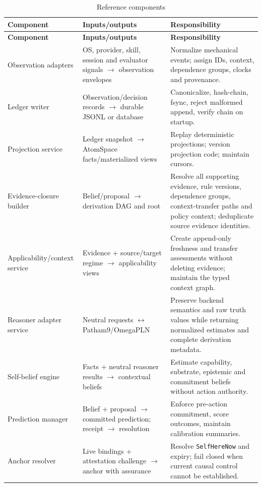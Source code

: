 \documentclass[11pt,oneside]{report}
\newcommand{\SelfHereNow}{\texttt{SelfHereNow}}
\begin{document}
\begin{longtable}{@{}L{1.50in}L{1.90in}L{3.05in}@{}}
\caption{Reference components}\label{tab:components}\\
\toprule
\textbf{Component} & \textbf{Inputs/outputs} & \textbf{Responsibility} \\
\midrule
\endfirsthead
\toprule
\textbf{Component} & \textbf{Inputs/outputs} & \textbf{Responsibility} \\
\midrule
\endhead
Observation adapters & OS, provider, skill, session and evaluator signals $\rightarrow$ observation envelopes & Normalize mechanical events; assign IDs, context, dependence groups, clocks and provenance. \\
Ledger writer & Observation/decision records $\rightarrow$ durable JSONL or database & Canonicalize, hash-chain, fsync, reject malformed append, verify chain on startup. \\
Projection service & Ledger snapshot $\rightarrow$ AtomSpace facts/materialized views & Replay deterministic projections; version projection code; maintain cursors. \\
Evidence-closure builder & Belief/proposal $\rightarrow$ derivation DAG and root & Resolve all supporting evidence, rule versions, dependence groups, context-transfer paths and policy context; deduplicate source evidence identities. \\
Applicability/context service & Evidence + source/target regime $\rightarrow$ applicability views & Create append-only freshness and transfer assessments without deleting evidence; maintain the typed context graph. \\
Reasoner adapter service & Neutral requests $\leftrightarrow$ Patham9/OmegaPLN & Preserve backend semantics and raw truth values while returning normalized estimates and complete derivation metadata. \\
Self-belief engine & Facts + neutral reasoner results $\rightarrow$ contextual beliefs & Estimate capability, substrate, epistemic and commitment beliefs without action authority. \\
Prediction manager & Belief + proposal $\rightarrow$ committed prediction; receipt $\rightarrow$ resolution & Enforce pre-action commitment, score outcomes, maintain calibration summaries. \\
Anchor resolver & Live bindings + attestation challenge $\rightarrow$ anchor with assurance & Resolve \SelfHereNow{} and expiry; fail closed when current causal control cannot be established. \\

\end{longtable}
\end{document}
